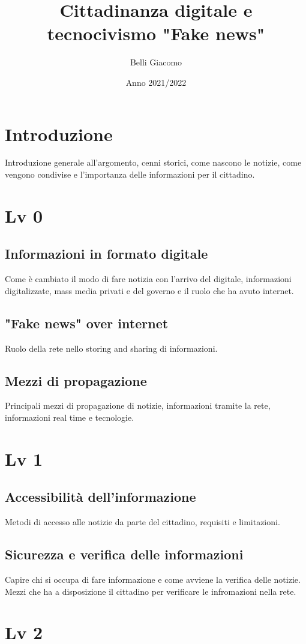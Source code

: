 \documentclass{article}
\title{Cittadinanza digitale e tecnocivismo "Fake news"}
\author{Belli Giacomo }
\date{Anno 2021/2022}
\begin{document}
\maketitle
\section{Introduzione}
Introduzione generale all'argomento, cenni storici, come nascono le notizie, come vengono condivise e l'importanza delle informazioni per il cittadino.
\section{Lv 0}
\subsection{Informazioni in formato digitale}
Come è cambiato il modo di fare notizia con l'arrivo del digitale, informazioni digitalizzate, mass media privati e del governo e il ruolo che ha avuto internet.
\subsection{"Fake news" over internet}
Ruolo della rete nello storing and sharing di informazioni.
\subsection{Mezzi di propagazione}
Principali mezzi di propagazione di notizie, informazioni tramite la rete, informazioni real time e tecnologie.
\section{Lv 1}
\subsection{Accessibilità dell'informazione}
Metodi di accesso alle notizie da parte del cittadino, requisiti e limitazioni.
\subsection{Sicurezza e verifica delle informazioni}
Capire chi si occupa di fare informazione e come avviene la verifica delle notizie.
Mezzi che ha a disposizione il cittadino per verificare le infromazioni nella rete.
\section{Lv 2}
\end{document}

